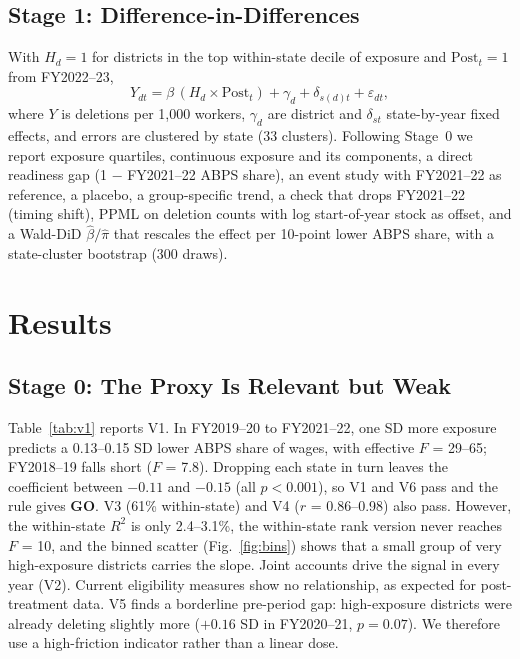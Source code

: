 \documentclass[10pt,twocolumn,letterpaper]{article}
\begin{document}
\subsection{Stage 1: Difference-in-Differences}
With $H_d = 1$ for districts in the top within-state decile of exposure and $\text{Post}_t = 1$ from FY2022--23,
\begin{equation}
Y_{dt} = \beta\, (H_d \times \text{Post}_t) + \gamma_d + \delta_{s(d)t} + \varepsilon_{dt},
\end{equation}
where $Y$ is deletions per 1,000 workers, $\gamma_d$ are district and $\delta_{st}$ state-by-year fixed effects, and errors are clustered by state (33 clusters). Following Stage~0 we report exposure quartiles, continuous exposure and its components, a direct readiness gap (1 $-$ FY2021--22 ABPS share), an event study with FY2021--22 as reference, a placebo, a group-specific trend, a check that drops FY2021--22 (timing shift), PPML on deletion counts with log start-of-year stock as offset, and a Wald-DiD $\hat\beta/\hat\pi$ that rescales the effect per 10-point lower ABPS share, with a state-cluster bootstrap (300 draws).

\section{Results}
\subsection{Stage 0: The Proxy Is Relevant but Weak}
Table~\ref{tab:v1} reports V1. In FY2019--20 to FY2021--22, one SD more exposure predicts a 0.13--0.15 SD lower ABPS share of wages, with effective $F$ = 29--65; FY2018--19 falls short ($F$ = 7.8). Dropping each state in turn leaves the coefficient between $-0.11$ and $-0.15$ (all $p<0.001$), so V1 and V6 pass and the rule gives \textbf{GO}. V3 (61\% within-state) and V4 ($r$ = 0.86--0.98) also pass. However, the within-state $R^2$ is only 2.4--3.1\%, the within-state rank version never reaches $F$ = 10, and the binned scatter (Fig.~\ref{fig:bins}) shows that a small group of very high-exposure districts carries the slope. Joint accounts drive the signal in every year (V2). Current eligibility measures show no relationship, as expected for post-treatment data. V5 finds a borderline pre-period gap: high-exposure districts were already deleting slightly more ($+0.16$ SD in FY2020--21, $p=0.07$). We therefore use a high-friction indicator rather than a linear dose.
\end{document}
